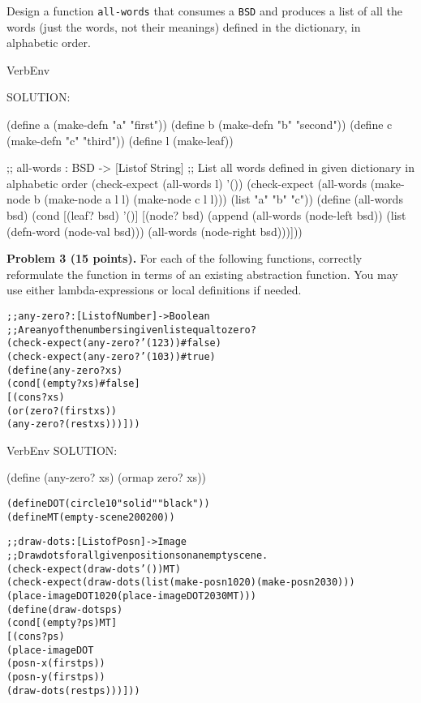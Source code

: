 \documentclass[12pt]{article}
\begin{document}
Design a function {\tt all-words} that consumes a {\tt BSD} and
produces a list of all the words (just the words, not their meanings)
defined in the dictionary, in alphabetic order.


\begin{SaveVerbatim}{VerbEnv}


SOLUTION:

(define a (make-defn "a" "first"))
(define b (make-defn "b" "second"))
(define c (make-defn "c" "third"))
(define l (make-leaf))

;; all-words : BSD -> [Listof String]
;; List all words defined in given dictionary in alphabetic order
(check-expect (all-words l) '())
(check-expect (all-words (make-node b (make-node a l l) (make-node c l l)))
              (list "a" "b" "c"))
(define (all-words bsd)
  (cond [(leaf? bsd) '()]
        [(node? bsd)
         (append (all-words (node-left bsd))
                 (list (defn-word (node-val bsd)))
                 (all-words (node-right bsd)))]))
\end{SaveVerbatim}



\newpage


\noindent
{\bf Problem 3 (15 points).}
%
For each of the following functions, correctly reformulate the
function in terms of an existing abstraction function.  You may use
either lambda-expressions or local definitions if needed.

\begin{alltt}
;; any-zero? : [Listof Number] -> Boolean
;; Are any of the numbers in given list equal to zero?
(check-expect (any-zero? '(1 2 3)) #false)
(check-expect (any-zero? '(1 0 3)) #true)
(define (any-zero? xs)
  (cond [(empty? xs) #false]
        [(cons? xs)
         (or (zero? (first xs))
             (any-zero? (rest xs)))]))
\end{alltt}


\vspace{.8in}

\begin{SaveVerbatim}{VerbEnv}
SOLUTION:

(define (any-zero? xs) (ormap zero? xs))

\end{SaveVerbatim}




\begin{alltt}
(define DOT (circle 10 "solid" "black"))
(define MT (empty-scene 200 200))

;; draw-dots : [Listof Posn] -> Image
;; Draw dots for all given positions on an empty scene.
(check-expect (draw-dots '()) MT)
(check-expect (draw-dots (list (make-posn 10 20) (make-posn 20 30)))
              (place-image DOT 10 20 (place-image DOT 20 30 MT)))
(define (draw-dots ps)
  (cond [(empty? ps) MT]
        [(cons? ps)
         (place-image DOT
                      (posn-x (first ps))
                      (posn-y (first ps))
                      (draw-dots (rest ps)))]))
\end{alltt}
\end{document}
